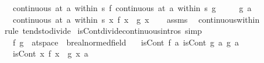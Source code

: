 \begin{isabellebody}
\ \ \ {\isachardoublequoteopen}continuous\ {\isacharparenleft}{\kern0pt}at\ a\ within\ s{\isacharparenright}{\kern0pt}\ f{\isachardoublequoteclose}\ {\isachardoublequoteopen}continuous\ {\isacharparenleft}{\kern0pt}at\ a\ within\ s{\isacharparenright}{\kern0pt}\ g{\isachardoublequoteclose}\isanewline
\ \ \ \ \ {\isachardoublequoteopen}g\ a\ {\isasymnoteq}\ {}{\isachardoublequoteclose}\isanewline
\ \ \ {\isachardoublequoteopen}continuous\ {\isacharparenleft}{\kern0pt}at\ a\ within\ s{\isacharparenright}{\kern0pt}\ {\isacharparenleft}{\kern0pt}{\isasymlambda}x{\isachardot}{\kern0pt}\ {\isacharparenleft}{\kern0pt}f\ x{\isacharparenright}{\kern0pt}\ {\isacharslash}{\kern0pt}\ {\isacharparenleft}{\kern0pt}g\ x{\isacharparenright}{\kern0pt}{\isacharparenright}{\kern0pt}{\isachardoublequoteclose}\isanewline
%
\isadelimproof
\ \ %
\endisadelimproof
%
\isatagproof
{}\isamarkupfalse%
\ assms\ \isamarkupfalse%
\ continuous{\isacharunderscore}{\kern0pt}within\ \isamarkupfalse%
\ {\isacharparenleft}{\kern0pt}rule\ tendsto{\isacharunderscore}{\kern0pt}divide{\isacharparenright}{\kern0pt}%
\endisatagproof
{\isafoldproof}%
%
\isadelimproof
\isanewline
%
\endisadelimproof
\isanewline
{}\isamarkupfalse%
\ isCont{\isacharunderscore}{\kern0pt}divide{\isacharbrackleft}{\kern0pt}continuous{\isacharunderscore}{\kern0pt}intros{\isacharcomma}{\kern0pt}\ simp{\isacharbrackright}{\kern0pt}{\isacharcolon}{\kern0pt}\isanewline
\ \ \ f\ g\ {\isacharcolon}{\kern0pt}{\isacharcolon}{\kern0pt}\ {\isachardoublequoteopen}{\isacharprime}{\kern0pt}a{\isacharcolon}{\kern0pt}{\isacharcolon}{\kern0pt}t{}{\isacharunderscore}{\kern0pt}space\ {\isasymRightarrow}\ {\isacharprime}{\kern0pt}b{\isacharcolon}{\kern0pt}{\isacharcolon}{\kern0pt}real{\isacharunderscore}{\kern0pt}normed{\isacharunderscore}{\kern0pt}field{\isachardoublequoteclose}\isanewline
\ \ \ {\isachardoublequoteopen}isCont\ f\ a{\isachardoublequoteclose}\ {\isachardoublequoteopen}isCont\ g\ a{\isachardoublequoteclose}\ {\isachardoublequoteopen}g\ a\ {\isasymnoteq}\ {}{\isachardoublequoteclose}\isanewline
\ \ \ {\isachardoublequoteopen}isCont\ {\isacharparenleft}{\kern0pt}{\isasymlambda}x{\isachardot}{\kern0pt}\ {\isacharparenleft}{\kern0pt}f\ x{\isacharparenright}{\kern0pt}\ {\isacharslash}{\kern0pt}\ g\ x{\isacharparenright}{\kern0pt}\ a{\isachardoublequoteclose}\isanewline
%
\isadelimproof
\ \ %
\endisadelimproof
%
\isatagproof

\end{isabellebody}
